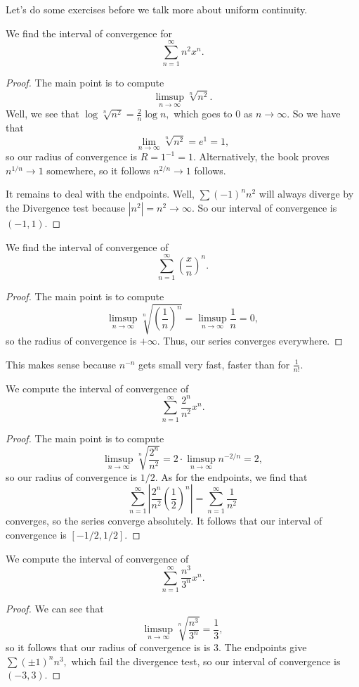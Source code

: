 Let's do some exercises before we talk more about uniform continuity.
\begin{exe}
	We find the interval of convergence for
	\[\sum_{n=1}^\infty n^2x^n.\]
\end{exe}
\begin{proof}
	The main point is to compute
	\[\limsup_{n\to\infty}\sqrt[n]{n^2}.\]
	Well, we see that $\log\sqrt[n]{n^2}=\frac2n\log n,$ which goes to $0$ as $n\to\infty.$ So we have that
	\[\lim_{n\to\infty}\sqrt[n]{n^2}=e^1=1,\]
	so our radius of convergence is $R=1^{-1}=1.$ Alternatively, the book proves $n^{1/n}\to1$ somewhere, so it follows $n^{2/n}\to1$ follows.

	It remains to deal with the endpoints. Well, $\sum(-1)^nn^2$ will always diverge by the Divergence test because $\left|n^2\right|=n^2\to\infty.$ So our interval of convergence is $\boxed{(-1,1)}.$
\end{proof}
\begin{exercise}
	We find the interval of convergence of
	\[\sum_{n=1}^\infty\left(\frac xn\right)^n.\]
\end{exercise}
\begin{proof}
	The main point is to compute
	\[\limsup_{n\to\infty}\sqrt[n]{\left(\frac1n\right)^n}=\limsup_{n\to\infty}\frac1n=0,\]
	so the radius of convergence is $+\infty.$ Thus, our series converges $\boxed{\text{everywhere}}.$
\end{proof}
\begin{remark}
	This makes sense because $n^{-n}$ gets small very fast, faster than for $\frac1{n!}.$
\end{remark}
\begin{exercise}
	We compute the interval of convergence of
	\[\sum_{n=1}^\infty\frac{2^n}{n^2}x^n.\]
\end{exercise}
\begin{proof}
	The main point is to compute
	\[\limsup_{n\to\infty}\sqrt[n]{\frac{2^n}{n^2}}=2\cdot\limsup_{n\to\infty}n^{-2/n}=2,\]
	so our radius of convergence is $1/2.$ As for the endpoints, we find that
	\[\sum_{n=1}^\infty\left|\frac{2^n}{n^2}\left(\frac12\right)^n\right|=\sum_{n=1}^\infty\frac1{n^2}\]
	converges, so the series converge absolutely. It follows that our interval of convergence is $\boxed{[-1/2,1/2]}.$
\end{proof}
\begin{exe}
	We compute the interval of convergence of
	\[\sum_{n=1}^\infty\frac{n^3}{3^n}x^n.\]
\end{exe}
\begin{proof}
	We can see that
	\[\limsup_{n\to\infty}\sqrt[n]{\frac{n^3}{3^n}}=\frac13,\]
	so it follows that our radius of convergence is is $3.$ The endpoints give $\sum(\pm1)^nn^3,$ which fail the divergence test, so our interval of convergence is $\boxed{(-3,3)}.$
\end{proof}

